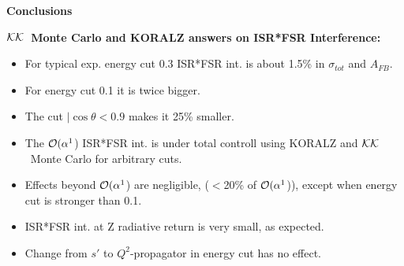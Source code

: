 \documentclass[dvips,portrait]{cernsem}             %
\def\Order#1{${\cal O}(#1$)}
\newcommand{\KK}{${\cal KK}$}
\begin{document}









\begin{Slide}{{\bf\color{red} Conclusions }}

\vspace{-2mm}
{\bf\color{blue}
  \KK\ Monte Carlo and KORALZ answers on ISR*FSR Interference:\\
  \begin{itemize}
  \item
    For typical exp. energy cut 0.3 ISR*FSR int. is about 1.5\% in $\sigma_{tot}$ and $A_{FB}$.
  \item
    For energy cut 0.1 it is twice bigger.
  \item
    The cut $|\cos\theta<0.9$ makes it 25\% smaller.
  \item
    The \Order{\alpha^1} ISR*FSR int. is under total controll using KORALZ and \KK\ Monte Carlo
    for arbitrary cuts.
  \item
    Effects beyond \Order{\alpha^1} are negligible, ($<$20\% of \Order{\alpha^1}),
    except when energy cut is stronger than 0.1.
  \item
    ISR*FSR int. at Z radiative return is very small, as expected.
  \item
    Change from $s'$ to $Q^2$-propagator in energy cut has no effect.
  \end{itemize}
}


\end{Slide}                               %
\end{document}
